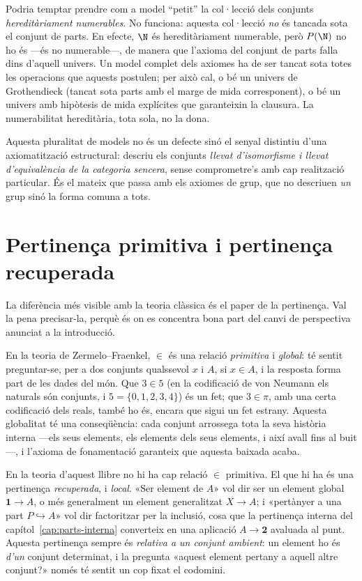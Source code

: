 \begin{observacio}\label{obs:no-hcountable}
Podria temptar prendre com a model \enquote{petit} la col·lecció dels conjunts
\emph{hereditàriament numerables}. No funciona: aquesta col·lecció \emph{no}
és tancada sota el conjunt de parts. En efecte, \(\N\) és hereditàriament
numerable, però \(P(\N)\) no ho és ---és no numerable---, de manera que
l'axioma del conjunt de parts falla dins d'aquell univers. Un model complet
dels axiomes ha de ser tancat sota totes les operacions que aquests postulen;
per això cal, o bé un univers de Grothendieck (tancat sota parts amb el marge
de mida corresponent), o bé un univers amb hipòtesis de mida explícites que
garanteixin la clausura. La numerabilitat hereditària, tota sola, no la dona.
\end{observacio}

Aquesta pluralitat de models no és un defecte sinó el senyal distintiu
d'una axiomatització estructural: descriu els conjunts \emph{llevat
d'isomorfisme i llevat d'equivalència de la categoria sencera}, sense
comprometre's amb cap realització particular. És el mateix que passa amb
els axiomes de grup, que no descriuen \emph{un} grup sinó la forma comuna
a tots.

\section{Pertinença primitiva i pertinença recuperada}\label{sec:pertinenca}

La diferència més visible amb la teoria clàssica és el paper de la
pertinença. Val la pena precisar-la, perquè és on es concentra bona part
del canvi de perspectiva anunciat a la introducció.

En la teoria de Zermelo--Fraenkel, \(\in\) és una relació \emph{primitiva}
i \emph{global}: té sentit preguntar-se, per a dos conjunts qualssevol
\(x\) i \(A\), si \(x\in A\), i la resposta forma part de les dades del
món. Que \(3\in 5\) (en la codificació de von Neumann els naturals són
conjunts, i \(5=\{0,1,2,3,4\}\)) és un fet; que \(3\in\pi\), amb una certa
codificació dels reals, també ho és, encara que sigui un fet estrany.
Aquesta globalitat té una conseqüència: cada conjunt arrossega tota la
seva història interna ---els seus elements, els elements dels seus
elements, i així avall fins al buit---, i l'axioma de fonamentació
garanteix que aquesta baixada acaba.

En la teoria d'aquest llibre no hi ha cap relació \(\in\) primitiva. El
que hi ha és una pertinença \emph{recuperada}, i \emph{local}. «Ser
element de \(A\)» vol dir ser un element global \(\mathbf1\to A\), o més
generalment un element generalitzat \(X\to A\); i «pertànyer a una part
\(P\hookrightarrow A\)» vol dir factoritzar per la inclusió, cosa que la
pertinença interna del capítol~\ref{cap:parts-interna} converteix en una
aplicació \(A\to\mathbf2\) avaluada al punt. Aquesta pertinença sempre és
\emph{relativa a un conjunt ambient}: un element ho és \emph{d'un} conjunt
determinat, i la pregunta «aquest element pertany a aquell altre conjunt?»
només té sentit un cop fixat el codomini.


